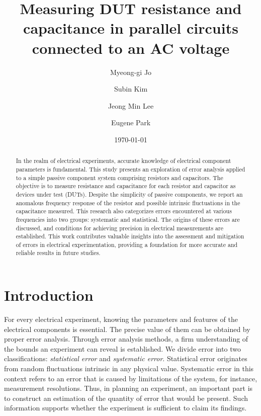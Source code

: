 \documentclass[%
 aip,
 amsmath,amssymb,
 reprint,%
]{revtex4-1}
\begin{document}

\title[Intermediate Physics Laboratory 2, Module 1]{Measuring DUT resistance and capacitance in parallel circuits connected to an AC voltage}
\author{Myeong-gi Jo}
\author{Subin Kim}
\author{Jeong Min Lee}
\author{Eugene Park}



\date{\today}
\begin{abstract}
In the realm of electrical experiments, accurate knowledge of electrical component parameters is fundamental. This study presents an exploration of error analysis applied to a simple passive component system comprising resistors and capacitors. The objective is to measure resistance and capacitance for each resistor and capacitor as devices under test (DUTs). Despite the simplicity of passive components, we report an anomalous frequency response of the resistor and possible intrinsic fluctuations in the capacitance measured. This research also categorizes errors encountered at various frequencies into two groups: systematic and statistical. The origins of these errors are discussed, and conditions for achieving precision in electrical measurements are established. This work contributes valuable insights into the assessment and mitigation of errors in electrical experimentation, providing a foundation for more accurate and reliable results in future studies.

\end{abstract}

\maketitle

\section{\label{sec:Intro} Introduction} 

For every electrical experiment, knowing the parameters and features of the electrical components is essential. The precise value of them can be obtained by proper error analysis. Through error analysis methods, a firm understanding of the bounds an experiment can reveal is established. We divide error into two classifications: \textit{statistical error} and \textit{systematic error}. Statistical error originates from random fluctuations intrinsic in any physical value. Systematic error in this context refers to an error that is caused by limitations of the system, for instance, measurement resolutions. Thus, in planning an experiment, an important part is to construct an estimation of the quantity of error that would be present. Such information supports whether the experiment is sufficient to claim its findings. 
\end{document}

